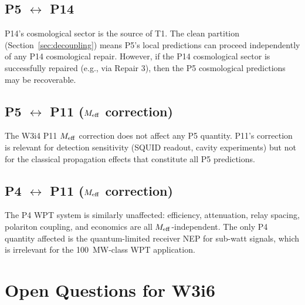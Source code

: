 \documentclass[11pt]{article}
\newcommand{\Meff}{M_{\rm eff}}
\begin{document}
\subsection{P5 $\leftrightarrow$ P14}

P14's cosmological sector is the source of T1. The clean partition
(Section~\ref{sec:decoupling}) means P5's local predictions can proceed
independently of any P14 cosmological repair. However, if the P14 cosmological
sector is successfully repaired (e.g., via Repair 3), then the P5 cosmological
predictions may be recoverable.

\subsection{P5 $\leftrightarrow$ P11 ($\Meff$ correction)}

The W3i4 P11 $\Meff$ correction does not affect any P5 quantity. P11's
correction is relevant for detection sensitivity (SQUID readout, cavity
experiments) but not for the classical propagation effects that constitute
all P5 predictions.

\subsection{P4 $\leftrightarrow$ P11 ($\Meff$ correction)}

The P4 WPT system is similarly unaffected: efficiency, attenuation, relay
spacing, polariton coupling, and economics are all $\Meff$-independent.
The only P4 quantity affected is the quantum-limited receiver NEP for
sub-watt signals, which is irrelevant for the 100~MW-class WPT application.

\section{Open Questions for W3i6}
\label{sec:open}
\end{document}

